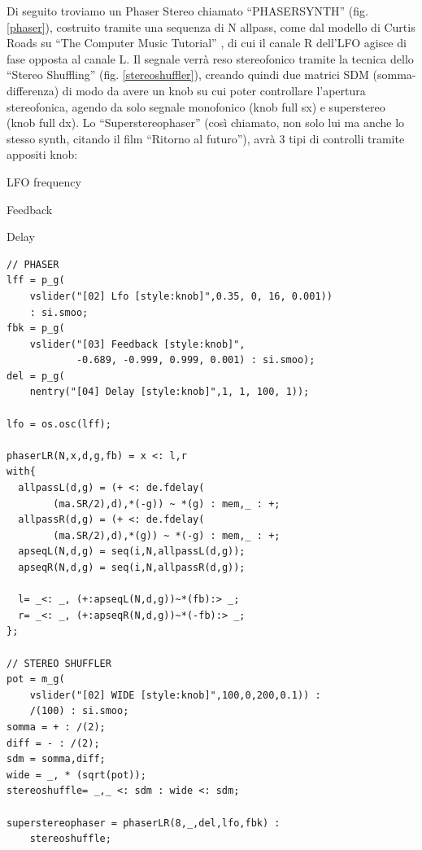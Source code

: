 \documentclass[
	a4paper,
	twocolumn
	]{article}
\begin{document}
Di seguito troviamo un Phaser Stereo chiamato “PHASERSYNTH” (fig. \ref{phaser}),
costruito tramite una sequenza di N allpass, come dal modello di Curtis Roads su
“The Computer Music Tutorial” \cite{cr96cmt}, di cui il canale R dell'LFO agisce di fase opposta al
canale L. Il segnale verrà reso stereofonico tramite la tecnica dello
“Stereo Shuffling” (fig. \ref{stereoshuffler}), creando quindi due matrici SDM \cite{ab58} (somma-differenza) di
modo da avere un knob su cui poter controllare l'apertura stereofonica, agendo da solo segnale
monofonico (knob full sx) e superstereo (knob full dx). Lo “Superstereophaser”
(così chiamato, non solo lui ma anche lo stesso synth, citando il film “Ritorno al futuro”), avrà 3 tipi di controlli
tramite appositi knob:
\begin{compactitem}
\item LFO frequency
\item Feedback
\item Delay
\end{compactitem}



\begin{lstlisting}
// PHASER
lff = p_g(
	vslider("[02] Lfo [style:knob]",0.35, 0, 16, 0.001))
	: si.smoo;
fbk = p_g(
	vslider("[03] Feedback [style:knob]",
	        -0.689, -0.999, 0.999, 0.001) : si.smoo);
del = p_g(
	nentry("[04] Delay [style:knob]",1, 1, 100, 1));

lfo = os.osc(lff);

phaserLR(N,x,d,g,fb) = x <: l,r
with{
  allpassL(d,g) = (+ <: de.fdelay(
		(ma.SR/2),d),*(-g)) ~ *(g) : mem,_ : +;
  allpassR(d,g) = (+ <: de.fdelay(
		(ma.SR/2),d),*(g)) ~ *(-g) : mem,_ : +;
  apseqL(N,d,g) = seq(i,N,allpassL(d,g));
  apseqR(N,d,g) = seq(i,N,allpassR(d,g));

  l= _<: _, (+:apseqL(N,d,g))~*(fb):> _;
  r= _<: _, (+:apseqR(N,d,g))~*(-fb):> _;
};

// STEREO SHUFFLER
pot = m_g(
	vslider("[02] WIDE [style:knob]",100,0,200,0.1)) :
	/(100) : si.smoo;
somma = + : /(2);
diff = - : /(2);
sdm = somma,diff;
wide = _, * (sqrt(pot));
stereoshuffle= _,_ <: sdm : wide <: sdm;

superstereophaser = phaserLR(8,_,del,lfo,fbk) :
	stereoshuffle;
\end{lstlisting}
\end{document}
